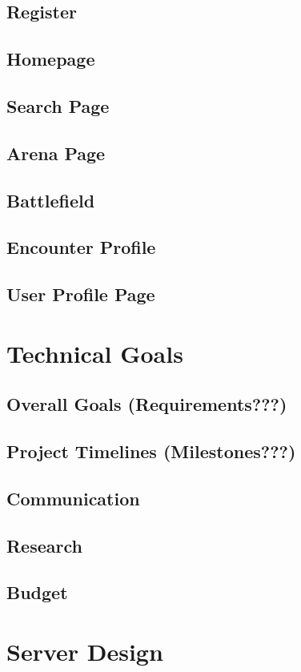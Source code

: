\documentclass[12pt,a4paper]{report}
\begin{document}
	\section{Register}
	\section{Homepage}
	\section{Search Page}
	\section{Arena Page}
	\section{Battlefield}
	\section{Encounter Profile}
	\section{User Profile Page}
	
\newpage
\chapter*{Technical Goals}
	\section{Overall Goals (Requirements???)}
	\section{Project Timelines (Milestones???)}
	\section{Communication}
	\section{Research}
	\section{Budget}

\newpage
\chapter*{Server Design}
\end{document}

